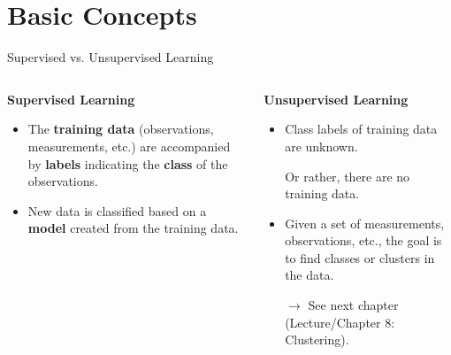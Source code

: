 \section{Basic Concepts}

\begin{frame}{Supervised vs. Unsupervised Learning}
	\begin{columns}
		\begin{column}{0.5\textwidth}
			\textbf{Supervised Learning}
			\begin{itemize}
				\item The \textbf{training data} (observations, measurements, etc.) are accompanied by \textbf{labels} indicating the \textbf{class} of the observations.
				\item New data is classified based on a \textbf{model} created from the training data.
			\end{itemize}

		\end{column}

		\begin{column}{0.5\textwidth}
			\textbf{Unsupervised Learning}

			\begin{itemize}
				\item Class labels of training data are unknown.

				      Or rather, there are no training data.
			\end{itemize}
			\begin{itemize}
				\item Given a set of measurements, observations, etc., the goal is to find classes or clusters in the data.

				      $\rightarrow$ See next chapter (Lecture/Chapter 8: Clustering).
			\end{itemize}

		\end{column}
	\end{columns}
\end{frame}

